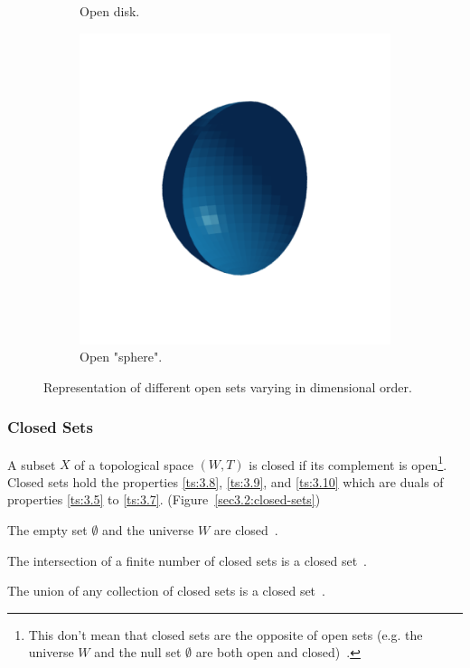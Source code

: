\documentclass[a4paper,11pt,oneside]{article}
\begin{document}
\begin{figure}[ht]
\begin{subfigure}[b]{0.2\textwidth}
		\caption{Open disk.}
	\end{subfigure}
	\hfill
	\begin{subfigure}[b]{0.2\textwidth}
		\centering
		\includegraphics[width=\textwidth]{section3/3.2/open-sphere.png}
		\caption{Open "sphere".}
	\end{subfigure}
	\hfill
	\caption{Representation of different open sets varying in dimensional order.}
	\label{sec3.2:open-sets}
\end{figure}

   
    
\subsubsection{Closed Sets}
\begin{definition}
	A subset $X$ of a topological space $(W, T)$ is closed if its complement is open\footnote{This don't mean that closed sets are the opposite of open sets (e.g. the universe $W$ and the null set $\emptyset$ are both open and closed)~\cite{mansfield_1987}.}. Closed sets hold the properties \eqref{ts:3.8}, \eqref{ts:3.9}, and \eqref{ts:3.10} which are duals of properties \eqref{ts:3.5} to \eqref{ts:3.7}. (Figure~\ref{sec3.2:closed-sets})
				    
	\begin{property}
		\label{ts:3.8}
		The empty set $\emptyset$ and the universe $W$ are closed~\cite{mansfield_1987}.
	\end{property}
	\begin{property}
		\label{ts:3.9}
		The intersection of a finite number of closed sets is a closed set~\cite{mansfield_1987}.
	\end{property}
	\begin{property}
		\label{ts:3.10}
		The union of any collection of closed sets is a closed set~\cite{mansfield_1987}.
	\end{property}
\end{definition}
    
\end{document}
